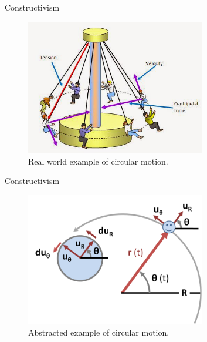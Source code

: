 \documentclass[xcolor=x11names,compress]{beamer}
\begin{document}
\begin{frame}{Constructivism}
	\begin{figure}
		\centering
		\includegraphics[width=0.7\textwidth]{img/constructivism_circular_motion.png}
		\caption{Real world example of circular motion.}
		\label{fig:constructivism_example_part_1}
	\end{figure}
\end{frame}

\begin{frame}{Constructivism}
	\begin{figure}
		\centering
		\includegraphics[width=0.7\textwidth]{img/constructivism_vectors.png}
		\caption{Abstracted example of circular motion.}
		\label{fig:constructivism_example_part_2}
	\end{figure}
\end{frame}
\end{document}

